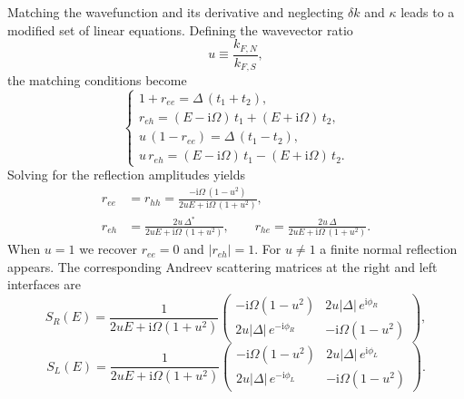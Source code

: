 \documentclass[11pt,a4paper,twoside,openany]{report}
\begin{document}
Matching the wavefunction and its derivative and neglecting $\delta k$ and $\kappa$ leads to a modified set of linear equations. Defining the wavevector ratio
\begin{equation}
  u \equiv \frac{k_{F,N}}{k_{F,S}},
\end{equation}
the matching conditions become
\begin{equation}
  \begin{cases}
    1 + r_{ee} = \Delta\,(t_1 + t_2), \\
    r_{eh}    = (E - \mathrm{i}\Omega)\,t_1 + (E + \mathrm{i}\Omega)\,t_2, \\
    u\,(1 - r_{ee}) = \Delta\,(t_1 - t_2), \\
    u\,r_{eh} = (E - \mathrm{i}\Omega)\,t_1 - (E + \mathrm{i}\Omega)\,t_2 .
  \end{cases}
  \label{eq:matching_u}
\end{equation}
Solving for the reflection amplitudes yields
\begin{equation}
  \boxed{
  \begin{aligned}
    r_{ee} &= r_{hh} = \frac{-\mathrm{i}\Omega\,(1-u^2)}{2uE + \mathrm{i}\Omega\,(1+u^2)}, \\[4pt]
    r_{eh} &= \frac{2u\,\Delta^*}{2uE + \mathrm{i}\Omega\,(1+u^2)}, \qquad
    r_{he} = \frac{2u\,\Delta}{2uE + \mathrm{i}\Omega\,(1+u^2)} .
  \end{aligned}}
  \label{eq:reflection_u}
\end{equation}
When $u=1$ we recover $r_{ee}=0$ and $|r_{eh}|=1$. For $u\neq1$ a finite normal reflection appears. The corresponding Andreev scattering matrices at the right and left interfaces are
\begin{equation}
  S_R(E) = \frac{1}{2uE+\mathrm{i}\Omega(1+u^2)}
            \begin{pmatrix}
              -\mathrm{i}\Omega(1-u^2) & 2u|\Delta|\,e^{\mathrm{i}\phi_R} \\[2pt]
              2u|\Delta|\,e^{-\mathrm{i}\phi_R} & -\mathrm{i}\Omega(1-u^2)
            \end{pmatrix},
  \label{eq:S_R_u}
\end{equation}
\begin{equation}
  S_L(E) = \frac{1}{2uE+\mathrm{i}\Omega(1+u^2)}
            \begin{pmatrix}
              -\mathrm{i}\Omega(1-u^2) & 2u|\Delta|\,e^{\mathrm{i}\phi_L} \\[2pt]
              2u|\Delta|\,e^{-\mathrm{i}\phi_L} & -\mathrm{i}\Omega(1-u^2)
            \end{pmatrix}.
  \label{eq:S_L_u}
\end{equation}
\end{document}
